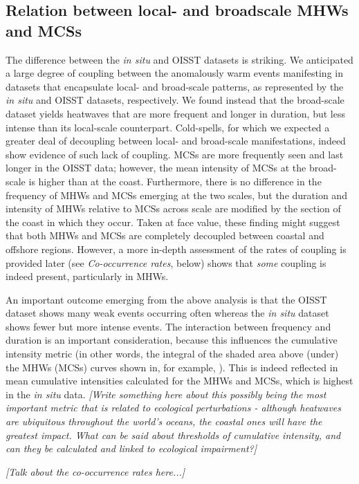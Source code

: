 \documentclass[a4paper,10pt,review]{elsarticle}
\begin{document}
\subsection{Relation between local- and broadscale MHWs and MCSs}
The difference between the \emph{in situ} and OISST datasets is striking. We anticipated a large degree of coupling between the anomalously warm events manifesting in datasets that encapsulate local- and broad-scale patterns, as represented by the \emph{in situ} and OISST datasets, respectively. We found instead that the broad-scale dataset yields heatwaves that are more frequent and longer in duration, but less intense than its local-scale counterpart. Cold-spells, for which we expected a greater deal of decoupling between local- and broad-scale manifestations, indeed show evidence of such lack of coupling. MCSs are more frequently seen and last longer in the OISST data; however, the mean intensity of MCSs at the broad-scale is higher than at the coast. Furthermore, there is no difference in the frequency of MHWs and MCSs emerging at the two scales, but the duration and intensity of MHWs relative to MCSs across scale are modified by the section of the coast in which they occur. Taken at face value, these finding might suggest that both MHWs and MCSs are completely decoupled between coastal and offshore regions. However, a more in-depth assessment of the rates of coupling is provided later (see \emph{Co-occurrence rates}, below) shows that \emph{some} coupling is indeed present, particularly in MHWs.

An important outcome emerging from the above analysis is that the OISST dataset shows many weak events occurring often whereas the \emph{in situ} dataset shows fewer but more intense events. The interaction between frequency and duration is an important consideration, because this influences the cumulative intensity metric (in other words, the integral of the shaded area above (under) the MHWs (MCSs) curves shown in, for example, ). This is indeed reflected in mean cumulative intensities calculated for the MHWs and MCSs, which is highest in the \emph{in situ} data. \emph{[Write something here about this possibly being the most important metric that is related to ecological perturbations - although heatwaves are ubiquitous throughout the world's oceans, the coastal ones will have the greatest impact. What can be said about thresholds of cumulative intensity, and can they be calculated and linked to ecological impairment?]}

\emph{[Talk about the co-occurrence rates here...]}
\end{document}
